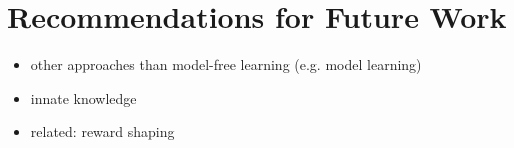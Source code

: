 \chapter{Recommendations for Future Work}
\label{ch:future_work}
\begin{itemize}
    \item other approaches than model-free learning (e.g. model learning)
    \item innate knowledge
    \item related: reward shaping
\end{itemize}